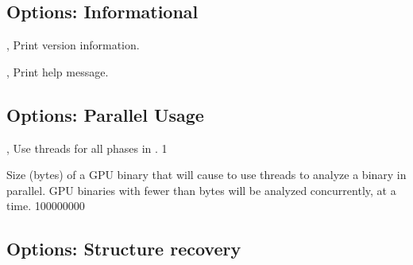 \documentclass[english]{article}
\begin{document}
\subsection{Options: Informational}

\begin{Description}

\item[\Opt{-V}, \Opt{--version}]
Print version information.

\item[\Opt{-h}, \Opt{--help}]
Print help message.

\end{Description}

\subsection{Options: Parallel Usage}
\item[\OptArg{-j}{num}, \OptArg{--jobs}{num}]
Use  threads for all phases in . {1}

\item[\OptArg{--gpu-size}{n}]
Size (bytes) of a GPU binary that will cause 
to use  threads to analyze a binary in parallel.
GPU binaries with fewer than  bytes will be analyzed
concurrently,  at a time.  {100000000}

\subsection{Options: Structure recovery}
\end{document}
